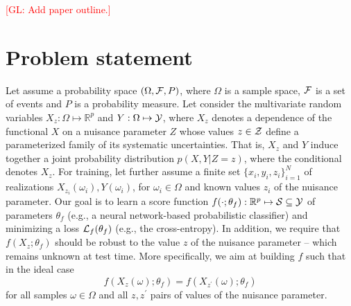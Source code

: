 \documentclass[twocolumn,superscriptaddress,aps]{revtex4-1}
\newcommand{\glnote}[1]{\textcolor{red}{[GL: #1]}}
\theoremstyle{plain}
\begin{document}
\glnote{Add paper outline.}


\section{Problem statement}
\label{sec:problem}

Let assume a probability space $(\Omega, {\cal F}, P)$, where $\Omega$ is a
sample space, ${\cal F}$ is a set of events and $P$ is a probability measure.
Let consider the multivariate random variables $X_z: \Omega \mapsto
\mathbb{R}^p$ and $Y: \Omega \mapsto {\cal Y}$, where $X_z$ denotes a dependence
of the functional $X$ on a nuisance parameter $Z$ whose values $z \in {\cal Z}$  define a
parameterized family of its systematic uncertainties. That is, $X_z$ and $Y$
induce together a joint probability distribution $p(X,Y|Z=z)$, where the
conditional denotes $X_z$. For training, let further assume a finite set $\{
x_i, y_i, z_i \}_{i=1}^N$ of realizations $X_{z_i}(\omega_i), Y(\omega_i)$, for
$\omega_i \in \Omega$ and known values $z_i$ of the nuisance parameter. Our goal
is to learn a score function $f(\cdot;\theta_f) : \mathbb{R}^p \mapsto {\cal S} \subseteq {\cal Y}$ of
parameters $\theta_f$ (e.g., a neural network-based probabilistic classifier) and minimizing  a loss ${\cal L}_f(\theta_f)$ (e.g.,
the cross-entropy). In addition, we require that $f(X_z ; \theta_f)$ should be
robust to the value $z$ of the nuisance parameter  -- which remains unknown at
test time. More specifically, we aim at building $f$ such that in the ideal case
\begin{equation}\label{eqn:criterion-true}
f(X_{z}(\omega) ; \theta_f) = f(X_{z^\prime}(\omega) ; \theta_f)
\end{equation} for all
samples $\omega \in \Omega$ and all $z, z^\prime$ pairs of values of the
nuisance parameter.
\end{document}
